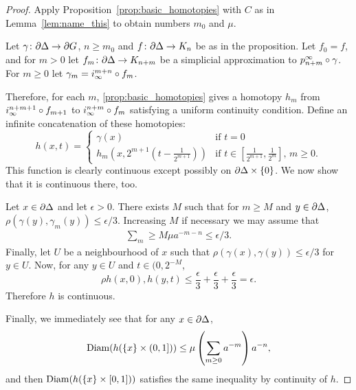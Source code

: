 \documentclass[a4paper]{article}
\begin{document}
\begin{proof}
  Apply Proposition~\ref{prop:basic_homotopies} with $C$ as in
  Lemma~\ref{lem:name_this} to obtain numbers $m_0$ and $\mu$.
  
  Let $\gamma\colon\partial\Delta\to\partial G$, $n\geq m_0$ and
  $f\colon\partial\Delta\to K_n$ be as in the proposition. Let $f_0 = f$,
  and for $m > 0$ let $f_m\colon\partial\Delta\to K_{n+m}$ be a
  simplicial approximation to $p^\infty_{n+m}\circ\gamma$. For $m \geq 0$
  let $\gamma_m = i^{m+n}_\infty\circ f_m$. 


  Therefore, for each $m$, \cref{prop:basic_homotopies} gives a homotopy $h_m$
  from $i^{n+m+1}_\infty\circ f_{m+1}$ to $i^{n+m}_\infty \circ f_m$
  satisfying a uniform continuity condition. Define an infinite concatenation
  of these homotopies:
  \begin{equation*}
    h(x,t) = 
    \begin{cases}
      \gamma(x) & \text{if } t = 0\\
      h_m\left(x,2^{m+1}\left(t-\frac{1}{2^{m+1}}\right)\right) 
              & \text{if $t \in \left[\frac{1}{2^{m+1}}, \frac{1}{2^m}\right]$
                    , $m\geq 0$}.
    \end{cases}
  \end{equation*}
  This function is clearly continuous except possibly on
  $\partial\Delta\times\{0\}$. We now show that it is continuous there, too.

  Let $x \in \partial\Delta$ and let $\epsilon > 0$. There exists $M$ such
  that for $m \geq M$ and $y \in \partial \Delta$, $\rho(\gamma(y),
  \gamma_m(y)) \leq \epsilon/3$. Increasing $M$ if necessary we may assume that
  \begin{align*}
    \sum_m \geq M \mu a^{-m-n} \leq \epsilon/3.
  \end{align*}
  Finally, let $U$ be a neighbourhood of $x$ such that $\rho(\gamma(x),
  \gamma(y)) \leq \epsilon/3$ for $y \in U$. Now, for any $y \in U$ and $t \in (0, 2^{-M}$,
  \begin{equation*}
    \rho{h(x,0), h(y,t)} \leq \frac{\epsilon}{3} + \frac{\epsilon}{3} +
        \frac{\epsilon}{3} = \epsilon.
  \end{equation*}
  Therefore $h$ is continuous.

  Finally, we immediately see that for any $x \in \partial\Delta$,
  \begin{equation*}
    \operatorname{Diam}(h(\{x\}\times (0,1])) \leq \mu \left(\sum_{m\geq 0} a^{-m}\right)a^{-n},
  \end{equation*}
  and then $\operatorname{Diam}(h(\{x\}\times [0,1]))$ satisfies the same inequality by
  continuity of $h$.
\end{proof}
\end{document}
